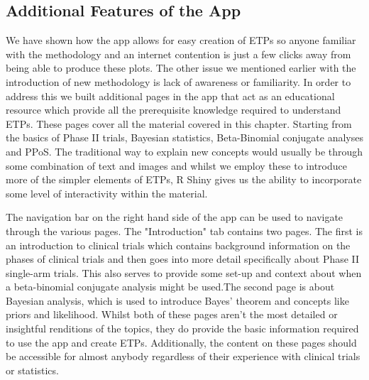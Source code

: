 \subsection{Additional Features of the App}

We have shown how the app allows for easy creation of ETPs so anyone familiar with the methodology and an internet contention is just a few clicks away from being able to produce these plots. The other issue we mentioned earlier with the introduction of new methodology is lack of awareness or familiarity. In order to address this we built additional pages in the app that act as an educational resource which provide all the prerequisite knowledge required to understand ETPs. These pages cover all the material covered in this chapter. Starting from the basics of Phase \RN{2} trials, Bayesian statistics, Beta-Binomial conjugate analyses and PPoS. The traditional way to explain new concepts would usually be through some combination of text and images and whilst we employ these to introduce more of the simpler elements of ETPs, R Shiny gives us the ability to incorporate some level of interactivity within the material. 

The navigation bar on the right hand side of the app can be used to navigate through the various pages. The "Introduction" tab contains two pages. The first is an introduction to clinical trials which contains background information on the phases of clinical trials and then goes into more detail specifically about Phase \RN{2} single-arm trials. This also serves to provide some set-up and context about when a beta-binomial conjugate analysis might be used.The second page is about Bayesian analysis, which is used to introduce Bayes' theorem and concepts like priors and likelihood. Whilst both of these pages aren't the most detailed or insightful renditions of the topics, they do provide the basic information required to use the app and create ETPs. Additionally, the content on these pages should be accessible for almost anybody regardless of their experience with clinical trials or statistics. 

